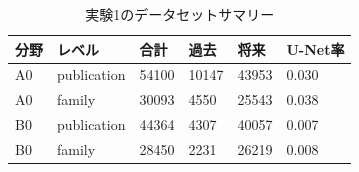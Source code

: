 \begin{table}[tbp]
\centering
\small
\caption{実験1のデータセットサマリー}
\label{tab:dataset\_summary}
\begin{tabular}{llllll}
\toprule
分野 & レベル & 合計 & 過去 & 将来 & U-Net率 \\
\midrule
A0 & publication & 54100 & 10147 & 43953 & 0.030 \\
A0 & family & 30093 & 4550 & 25543 & 0.038 \\
B0 & publication & 44364 & 4307 & 40057 & 0.007 \\
B0 & family & 28450 & 2231 & 26219 & 0.008 \\
\bottomrule
\end{tabular}
\end{table}
